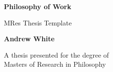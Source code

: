 

\begin{titlepage} %
   \begin{center} %
       \vspace*{1cm} %
 
        \Huge %
        \textbf{Philosophy of Work} %
        
        \hrulefill %
 
        \Large %
        
        \vspace{0.5cm} %
        MRes Thesis Template
 
        \vspace{1.3cm} %
 
        \LARGE
 
        \textbf{Andrew White}
 
        \vfill %
 
        \Large %
 
       A thesis presented for the degree of\\
       Masters of Research in Philosophy
 
       \vspace{1cm}
 

\end{center}
\end{titlepage}
